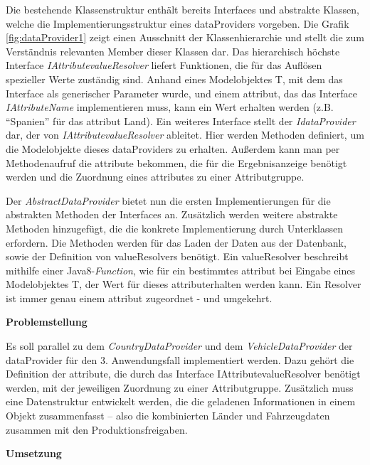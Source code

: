 Die bestehende Klassenstruktur enthält bereits Interfaces und abstrakte Klassen, welche die Implementierungsstruktur eines \gls{dataProvider}s vorgeben. Die Grafik \ref{fig:dataProvider1} zeigt einen Ausschnitt der Klassenhierarchie und stellt die zum Verständnis relevanten Member dieser Klassen dar. Das hierarchisch höchste Interface \textit{IAttribute\gls{valueResolver}} liefert Funktionen, die für das Auflösen spezieller Werte zuständig sind. Anhand eines Modelobjektes T, mit dem das Interface als generischer Parameter wurde, und einem \gls{attribut}, das das Interface \textit{IAttributeName} implementieren muss, kann ein Wert erhalten werden (z.B. \enquote{Spanien} für das \gls{attribut} Land).
Ein weiteres Interface stellt der \textit{I\gls{dataProvider}} dar, der von \textit{IAttribute\gls{valueResolver}} ableitet. Hier werden Methoden definiert, um die Modelobjekte dieses \gls{dataProvider}s zu erhalten. Außerdem kann man per Methodenaufruf die \gls{attribut}e bekommen, die für die Ergebnisanzeige benötigt werden und die Zuordnung eines \gls{attribut}es zu einer Attributgruppe.

Der \textit{AbstractDataProvider} bietet nun die ersten Implementierungen für die abstrakten Methoden der Interfaces an. Zusätzlich werden weitere abstrakte Methoden hinzugefügt, die die konkrete Implementierung durch Unterklassen erfordern. Die Methoden werden für das Laden der Daten aus der Datenbank, sowie der Definition von \gls{valueResolver}s  benötigt. Ein \gls{valueResolver} beschreibt mithilfe einer Java8-\textit{Function}, wie für ein bestimmtes \gls{attribut} bei Eingabe eines Modelobjektes T, der Wert für dieses \gls{attribut}erhalten werden kann. Ein Resolver ist immer genau einem \gls{attribut} zugeordnet - und umgekehrt.

\textbf{Problemstellung}

Es soll parallel zu dem \textit{CountryDataProvider} und dem \textit{VehicleDataProvider} der \gls{dataProvider} für den 3. Anwendungsfall implementiert werden. Dazu gehört die Definition der \gls{attribut}e, die durch das Interface IAttribute\gls{valueResolver} benötigt werden, mit der jeweiligen Zuordnung zu einer Attributgruppe. Zusätzlich muss eine Datenstruktur entwickelt werden, die die geladenen Informationen in einem Objekt zusammenfasst – also die kombinierten Länder und Fahrzeugdaten zusammen mit den Produktionsfreigaben.

\textbf{Umsetzung}

